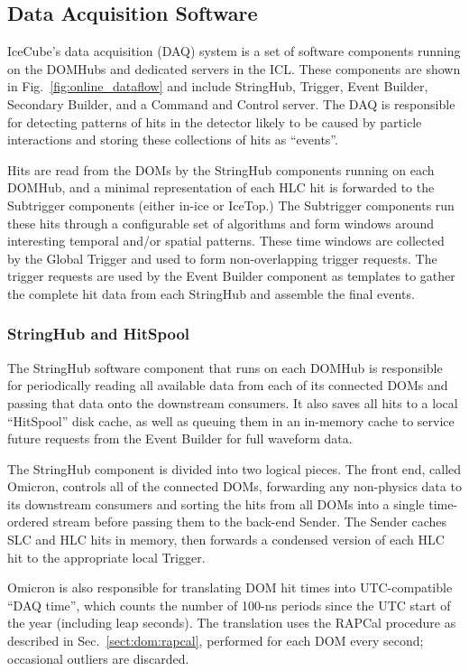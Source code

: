 \subsection{Data Acquisition Software}

IceCube's data acquisition (DAQ) system is a set of software components
running on the DOMHubs and dedicated servers in the ICL.  These components are shown in
Fig.~\ref{fig:online_dataflow} and include StringHub, Trigger, Event
Builder, Secondary Builder, and a Command and Control server.  The DAQ is
responsible for detecting patterns of hits in the detector likely to be
caused by particle interactions and storing these collections of hits as
``events''.

Hits are read from the DOMs by the
StringHub components running on each DOMHub, and a minimal representation of each HLC hit is
forwarded to the Subtrigger components (either in-ice or IceTop.)
The Subtrigger components run these hits through a
configurable set of algorithms and form windows around interesting temporal
and/or spatial patterns.  These time windows are collected by the
Global Trigger and used to form non-overlapping trigger requests.
The trigger requests are used by the Event Builder component as templates
to gather the complete hit data from each StringHub and assemble the final
events.

\subsubsection{StringHub and HitSpool}
\label{sec:domhub_hitspool}

The StringHub software component that runs on each DOMHub is responsible
for periodically reading all available data from each of its connected DOMs
and passing that data onto the downstream consumers.  It also saves all
hits to a local ``HitSpool'' disk cache, as well as queuing them in an
in-memory cache to service future requests from the Event Builder for full
waveform data.

The StringHub component is divided into two logical pieces.  The front end,
called Omicron, controls all of the connected DOMs, forwarding any
non-physics data to its downstream consumers and sorting the hits from all
DOMs into a single time-ordered stream before passing them to the back-end
Sender.  The Sender caches SLC and HLC hits in memory, then forwards a
condensed version of each HLC hit to the appropriate local Trigger.

Omicron is also responsible for translating DOM hit times into
UTC-compatible ``DAQ time'', which counts the number of 100-ns periods
since the UTC start of the year (including leap seconds).  The translation
uses the RAPCal procedure as described in Sec.~\ref{sect:dom:rapcal},
performed for each DOM every second; occasional outliers are discarded.

